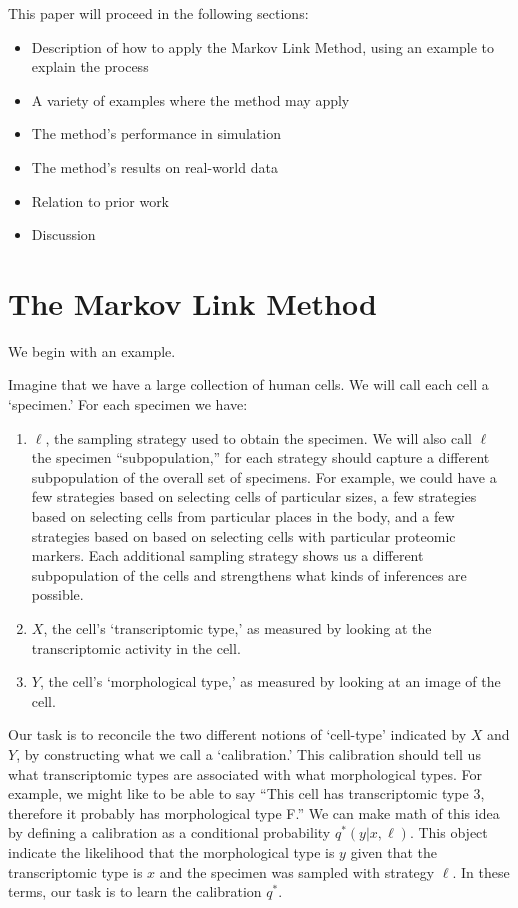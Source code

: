 This paper will proceed in the following sections:
\begin{itemize}
    \item Description of how to apply the Markov Link Method, using an example to explain the process
    \item A variety of examples where the method may apply
    \item The method's performance in simulation
    \item The method's results on real-world data
    \item Relation to prior work
    \item Discussion
\end{itemize}

%

\section{The Markov Link Method}

\label{sec:mlm}

We begin with an example.

Imagine that we have a large collection of human cells.  We will call each cell a `specimen.'  For each specimen we have:
%
\begin{enumerate}
    \item $\ell$, the sampling strategy used to obtain the specimen.  We will also call $\ell$ the specimen ``subpopulation,'' for each strategy should capture a different subpopulation of the overall set of specimens.  For example, we could have a few strategies based on selecting cells of particular sizes, a few strategies based on selecting cells from particular places in the body, and a few strategies based on based on selecting cells with particular proteomic markers.  Each additional sampling strategy shows us a different subpopulation of the cells and strengthens what kinds of inferences are possible. 
    \item $X$, the cell's `transcriptomic type,' as measured by looking at the transcriptomic activity in the cell.  
    \item $Y$, the cell's `morphological type,' as measured by looking at an image of the cell.
\end{enumerate}
%
Our task is to reconcile the two different notions of `cell-type' indicated by $X$ and $Y$, by constructing what we call a `calibration.'  This calibration should tell us what transcriptomic types are associated with what morphological types.  For example, we might like to be able to say ``This cell has transcriptomic type 3, therefore it probably has morphological type F.''  We can make math of this idea by defining a calibration as a conditional probability $q^*(y|x,\ell)$. This object indicate the likelihood that the morphological type is $y$ given that the transcriptomic type is $x$ and the specimen was sampled with strategy $\ell$.  In these terms, our task is to learn the calibration $q^*$.

